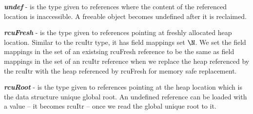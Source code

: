 \textit{\textbf{undef}} - is the type given to references where the content of the referenced location is inaccessible. A freeable object becomes undefined after it is reclaimed.

\textit{\textbf{rcuFresh}} - is the type given to references pointing at freshly allocated heap location. Similar to the \textsf{rcuItr} type, it has field mappings set $\N$. We set the field mappings in the set of an existsing \textsf{rcuFresh} reference to be the same as field mappings in the set of an \textsf{rcuItr} reference when we replace the heap referenced by the \textsf{rcuItr} with the heap referenced by \textsf{rcuFresh} for memory safe replacement.

\textit{\textbf{rcuRoot}} - is the type given to references pointing at the heap location which is the data structure unique global root. An undefined reference can be loaded with a value -- it becomes \textsf{rcuItr} -- once we read the global unique root to it.
